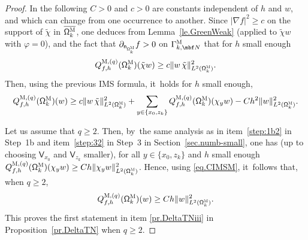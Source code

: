 \begin{proof}
In the following $C>0$ and $c>0$ are constants independent of $h$ and $w$, and which can change from one occurrence to another.
Since $\vert \nabla f\vert^2\ge c$ on the support of $\tilde \chi$ in $\overline {\mathsf \Omega_k^{\textsc{M}}}$, one deduces from Lemma~\ref{le.GreenWeak} (applied to $\tilde \chi w$ with $\varphi=0$), and the fact that $\partial_{\mathsf n_{ \mathsf \Omega_k^{\textsc{M}}}}f>0$ on $\Gamma_{k,\mbf N}^{\textsc{M}}$ that for $h$ small enough
\[
Q_{f,h}^{\textsc{M},(q)}(\mathsf \Omega_k^{\textsc{M}})(\tilde \chi w) \ge c \Vert w\, \tilde \chi \Vert_{L^2(\mathsf \Omega_k^{\textsc{M}})}^2.
\]
Then, using the previous IMS formula, it~holds for $h$ small enough,
\begin{equation}\label{eq.CIMSM}
Q_{f,h}^{\textsc{M},(q)}(\mathsf \Omega_k^{\textsc{M}})(w)\ge c \Vert w\, \tilde \chi \Vert_{L^2(\mathsf \Omega_k^{\textsc{M}})}^2 + \sum_{y\in \{x_0,z_k\}} Q_{f,h}^{\textsc{M},(q)}(\mathsf \Omega_k^{\textsc{M}})(\chi_y w) -C h^2 \Vert w \Vert_{L^2(\mathsf \Omega_k^{\textsc{M}})}^2.
\end{equation}

Let us assume that $q\ge 2$. Then, by~the same analysis as in item~\eqref{step:1b2} in Step~1b and item~\eqref{step:32} in Step~3 in Section~\ref{sec.numb-small}, one has (up to choosing $\mathsf V_{x_0}$ and $\mathsf V_{z_k}$ smaller), for all $y \in \{x_0,z_k\}$ and $h$ small enough
$ Q_{f,h}^{\textsc{M},(q)}(\mathsf \Omega_k^{\textsc{M}})(\chi_y w)\ge Ch \Vert \chi_yw \Vert_{L^2(\mathsf \Omega_k^{\textsc{M}})}^2$.
Hence, using \eqref{eq.CIMSM}, it~follows that, when $q\ge 2$,
\[
Q_{f,h}^{\textsc{M},(q)}(\mathsf \Omega_k^{\textsc{M}})(w)\ge Ch \Vert w \Vert_{L^2(\mathsf \Omega_k^{\textsc{M}})}^2.
\]
This proves the first statement in item \eqref{pr.DeltaTNiii} in Proposition~\ref{pr.DeltaTN} when $q\ge 2$.


\end{proof}
